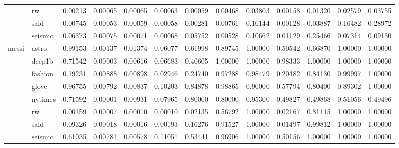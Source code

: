 \begin{tabular}{llrrrrrrrrrrr}
 & rw & 0.00213 & 0.00065 & 0.00065 & 0.00063 & 0.00059 & 0.00468 & 0.03803 & 0.00158 & 0.01320 & 0.02579 & 0.03755 \\
 & sald & 0.00745 & 0.00053 & 0.00059 & 0.00058 & 0.00281 & 0.00761 & 0.10144 & 0.00128 & 0.03887 & 0.16482 & 0.28972 \\
 & seismic & 0.06373 & 0.00075 & 0.00071 & 0.00068 & 0.05752 & 0.00528 & 0.10662 & 0.01129 & 0.25466 & 0.07314 & 0.09130 \\
\cline{1-13}
\multirow[t]{8}{*}{messi} & astro & 0.99153 & 0.00137 & 0.01374 & 0.06077 & 0.61998 & 0.89745 & 1.00000 & 0.50542 & 0.66870 & 1.00000 & 1.00000 \\
 & deep1b & 0.71542 & 0.00003 & 0.00616 & 0.06683 & 0.40605 & 1.00000 & 1.00000 & 0.98333 & 1.00000 & 1.00000 & 1.00000 \\
 & fashion & 0.19231 & 0.00888 & 0.00898 & 0.02946 & 0.24740 & 0.97288 & 0.98479 & 0.20482 & 0.84130 & 0.99997 & 1.00000 \\
 & glove & 0.96755 & 0.00792 & 0.00837 & 0.10203 & 0.84878 & 0.98865 & 0.90000 & 0.57794 & 0.80400 & 0.89302 & 1.00000 \\
 & nytimes & 0.71592 & 0.00001 & 0.00931 & 0.07965 & 0.80000 & 0.80000 & 0.95300 & 0.49827 & 0.49868 & 0.51056 & 0.49496 \\
 & rw & 0.00159 & 0.00007 & 0.00010 & 0.00010 & 0.02135 & 0.56792 & 1.00000 & 0.02167 & 0.81115 & 1.00000 & 1.00000 \\
 & sald & 0.09326 & 0.00018 & 0.00016 & 0.00193 & 0.16276 & 0.91527 & 1.00000 & 0.01497 & 0.99812 & 1.00000 & 1.00000 \\
 & seismic & 0.61035 & 0.00781 & 0.00578 & 0.11051 & 0.53441 & 0.96906 & 1.00000 & 0.50156 & 1.00000 & 1.00000 & 1.00000 \\
\cline{1-13}
\bottomrule
\end{tabular}
